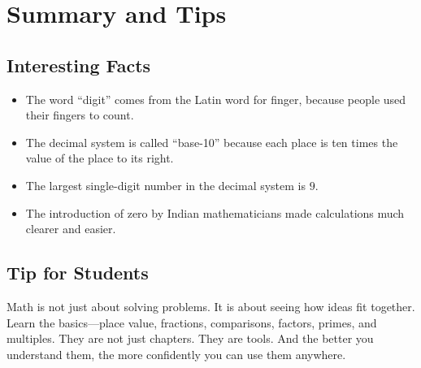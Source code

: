 \cleardoublepage
\section{Summary and Tips}

\subsection*{Interesting Facts}

\begin{itemize}
  \item The word ``digit'' comes from the Latin word for finger, because people used their fingers to count.
  \item The decimal system is called ``base-10'' because each place is ten times the value of the place to its right.
  \item The largest single-digit number in the decimal system is $9$.
  \item The introduction of zero by Indian mathematicians made calculations much clearer and easier.
\end{itemize}

\subsection*{Tip for Students}

Math is not just about solving problems. It is about seeing how ideas fit together. Learn the basics---place value, fractions, comparisons, factors, primes, and multiples. They are not just chapters. They are tools. And the better you understand them, the more confidently you can use them anywhere.
